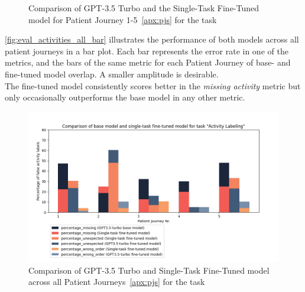 \begin{figure}[h]
  \caption{Comparison of GPT-3.5 Turbo and the Single-Task Fine-Tuned model for Patient Journey 1-5~\ref{apx:pjs} for the task }
  \label{fig:eval_activities_single_rad}
\end{figure}
\autoref{fig:eval_activities_all_bar} illustrates the performance of both models across all patient journeys in a bar plot. Each bar represents the error rate in one of the metrics, and the bars of the same metric for each Patient Journey of base- and fine-tuned model overlap. A smaller amplitude is desirable. \\
The fine-tuned model consistently scores better in the \emph{missing activity} metric but only occasionally outperforms the base model in any other metric. 
\begin{figure}[ht]
    \centering
    \captionsetup{belowskip=0pt,aboveskip=0pt}
    \includegraphics[width=\textwidth]{bachelor_thesis/images/activites_all-single.png}
    \caption{Comparison of GPT-3.5 Turbo and  Single-Task Fine-Tuned model across all Patient Journeys~\ref{apx:pjs} for the task } 
    \label{fig:eval_activities_all_bar}
\end{figure}

